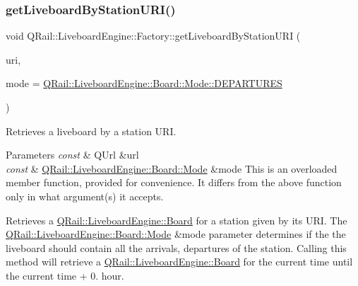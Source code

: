 \subsubsection{\texorpdfstring{getLiveboardByStationURI()}{getLiveboardByStationURI()}\hspace{0.1cm}{\footnotesize\ttfamily [1/2]}}
{\footnotesize\ttfamily void Q\+Rail\+::\+Liveboard\+Engine\+::\+Factory\+::get\+Liveboard\+By\+Station\+U\+RI (\begin{DoxyParamCaption}\item[{const Q\+Url \&}]{uri,  }\item[{const \mbox{\hyperlink{classQRail_1_1LiveboardEngine_1_1Board_a0ab6d318f405895f62c6e98cb2d86c6e}{Q\+Rail\+::\+Liveboard\+Engine\+::\+Board\+::\+Mode}} \&}]{mode = {\ttfamily \mbox{\hyperlink{classQRail_1_1LiveboardEngine_1_1Board_a0ab6d318f405895f62c6e98cb2d86c6ea560e6dfa758a32c703224545b841a386}{Q\+Rail\+::\+Liveboard\+Engine\+::\+Board\+::\+Mode\+::\+D\+E\+P\+A\+R\+T\+U\+R\+ES}}} }\end{DoxyParamCaption})}



Retrieves a liveboard by a station U\+RI. 


\begin{DoxyParams}{Parameters}
{\em const} & Q\+Url \&url \\
\hline
{\em const} & \mbox{\hyperlink{classQRail_1_1LiveboardEngine_1_1Board_a0ab6d318f405895f62c6e98cb2d86c6e}{Q\+Rail\+::\+Liveboard\+Engine\+::\+Board\+::\+Mode}} \&mode This is an overloaded member function, provided for convenience. It differs from the above function only in what argument(s) it accepts.\\
\hline
\end{DoxyParams}
Retrieves a \mbox{\hyperlink{classQRail_1_1LiveboardEngine_1_1Board}{Q\+Rail\+::\+Liveboard\+Engine\+::\+Board}} for a station given by it\textquotesingle{}s U\+RI. The \mbox{\hyperlink{classQRail_1_1LiveboardEngine_1_1Board_a0ab6d318f405895f62c6e98cb2d86c6e}{Q\+Rail\+::\+Liveboard\+Engine\+::\+Board\+::\+Mode}} \&mode parameter determines if the the liveboard should contain all the arrivals, departures of the station. Calling this method will retrieve a \mbox{\hyperlink{classQRail_1_1LiveboardEngine_1_1Board}{Q\+Rail\+::\+Liveboard\+Engine\+::\+Board}} for the current time until the current time + 0. hour. \mbox{\label{classQRail_1_1LiveboardEngine_1_1Factory_a3fc799d424334fe21be54a3cba0853be}} 

